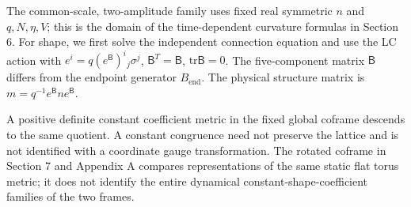 The common-scale, two-amplitude family uses fixed real symmetric $n$ and $q,N,\eta,V$; this is the domain of the time-dependent curvature formulas in Section 6. For shape, we first solve the independent connection equation and use the LC action with $e^i=q(e^{\mathsf B})^i{}_j\sigma^j$, $\mathsf B^T=\mathsf B$, $\mathrm{tr}\mathsf B=0$. The five-component matrix $\mathsf B$ differs from the endpoint generator $B_{\mathrm{end}}$. The physical structure matrix is $m=q^{-1}e^{\mathsf B}ne^{\mathsf B}$.

A positive definite constant coefficient metric in the fixed global coframe descends to the same quotient. A constant congruence need not preserve the lattice and is not identified with a coordinate gauge transformation. The rotated coframe in Section 7 and Appendix A compares representations of the same static flat torus metric; it does not identify the entire dynamical constant-shape-coefficient families of the two frames.
